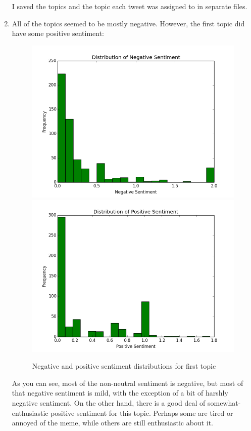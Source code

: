 \documentclass{article}
\begin{document}
\begin{enumerate}
		I saved the topics and the topic each tweet was assigned to in separate files.
		
		\item All of the topics seemed to be mostly negative. However, the first topic did have some positive sentiment:
		\begin{figure}[H]
			\includegraphics[scale=0.35]{0neg.png}
			\includegraphics[scale=0.35]{0pos.png}
			\begin{center}
			\caption{Negative and positive sentiment distributions for first topic}
			\end{center}
		\end{figure}
		As you can see, most of the non-neutral sentiment is negative, but most of that negative sentiment is mild, with the exception of a bit of harshly negative sentiment. On the other hand, there is a good deal of somewhat-enthusiastic positive sentiment for this topic. Perhaps some are tired or annoyed of the meme, while others are still enthusiastic about it.\\

\end{enumerate}
\end{document}
